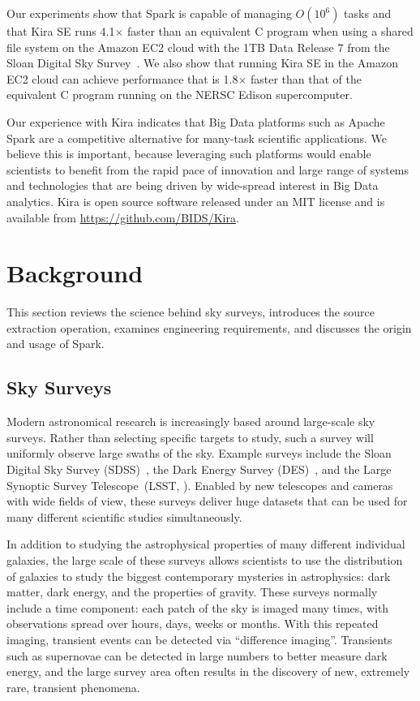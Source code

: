 \documentclass[10pt,journal,compsoc]{IEEEtran}
\begin{document}
Our experiments show that Spark is capable of managing $O(10^6)$ tasks and that Kira SE runs 4.1$\times$ faster than an equivalent C program when using a shared file system on the Amazon EC2 cloud with the 1TB Data Release 7 from the Sloan Digital Sky Survey~\cite{york00}. We also show that running Kira SE in the Amazon EC2 cloud can achieve performance that is 1.8$\times$ faster than that of the equivalent C program running on the NERSC Edison supercomputer.

Our experience with Kira indicates that Big Data platforms such as Apache Spark are a competitive alternative for many-task scientific applications.   
We believe this is important, because leveraging such platforms would enable scientists to benefit from the rapid pace of innovation and large range of systems and technologies that are being driven by wide-spread interest in Big Data analytics.
Kira is open source software released under an MIT license and is available from \linebreak \url{https://github.com/BIDS/Kira}.

\section{Background}
\label{sec:Background}

This section reviews the science behind sky surveys, introduces the source extraction operation, examines engineering requirements, and discusses the origin and usage of Spark.

\subsection{Sky Surveys}

Modern astronomical research is increasingly based around large-scale sky surveys.
Rather than selecting specific targets to study, such a survey will uniformly observe large
swaths of the sky. Example surveys include the Sloan Digital Sky Survey (SDSS)~\cite{york00},
the Dark Energy Survey (DES)~\cite{dark05}, and the Large Synoptic Survey Telescope~(LSST,
\cite{ivezic08}). Enabled by new telescopes and cameras with wide fields of view, these
surveys deliver huge datasets that can be used for many different scientific studies
simultaneously.

In addition to studying the astrophysical properties of many different individual galaxies,
the large scale of these surveys allows scientists to use the distribution of galaxies to
study the biggest contemporary mysteries in astrophysics: dark matter, dark energy, and 
the properties of gravity. These surveys normally include a time component: each patch of the sky is imaged many times,
with observations spread over hours, days, weeks or months. With this repeated imaging,
transient events can be detected via ``difference imaging''. Transients such as supernovae
can be detected in large numbers to better measure dark energy, and the large survey area
often results in the discovery of new, extremely rare, transient phenomena.
\end{document}
